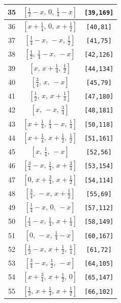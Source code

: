 \documentclass[fleqn,8pt]{jsarticle}
\begin{document}
\begin{longtable}{ccc}
35 & $\left[ \frac{1}{2} - x,\, 0,\, \frac{1}{4} - x \right]$ & {\tt [39,169]} \\ \hline
36 & $\left[ x + \frac{1}{4},\, 0,\, x + \frac{1}{2} \right]$ & {\tt [40,81]} \\ \hline
37 & $\left[ \frac{1}{4} - x,\, - x,\, \frac{1}{2} \right]$ & {\tt [41,75]} \\ \hline
38 & $\left[ \frac{1}{2},\, \frac{1}{4} - x,\, - x \right]$ & {\tt [42,126]} \\ \hline
39 & $\left[ x,\, x + \frac{1}{4},\, \frac{1}{2} \right]$ & {\tt [44,134]} \\ \hline
40 & $\left[ \frac{3}{4},\, x,\, - x \right]$ & {\tt [45,79]} \\ \hline
41 & $\left[ \frac{1}{2},\, x,\, x + \frac{1}{4} \right]$ & {\tt [47,180]} \\ \hline
42 & $\left[ x,\, - x,\, \frac{3}{4} \right]$ & {\tt [48,181]} \\ \hline
43 & $\left[ x + \frac{1}{4},\, \frac{1}{4} - x,\, \frac{1}{4} \right]$ & {\tt [50,118]} \\ \hline
44 & $\left[ x + \frac{1}{4},\, x + \frac{1}{2},\, \frac{1}{2} \right]$ & {\tt [51,161]} \\ \hline
45 & $\left[ x,\, \frac{1}{4},\, - x \right]$ & {\tt [52,56]} \\ \hline
46 & $\left[ \frac{3}{4} - x,\, \frac{1}{4},\, x + \frac{3}{4} \right]$ & {\tt [53,154]} \\ \hline
47 & $\left[ 0,\, x + \frac{3}{4},\, x + \frac{1}{2} \right]$ & {\tt [54,114]} \\ \hline
48 & $\left[ \frac{3}{4},\, - x,\, x + \frac{1}{2} \right]$ & {\tt [55,69]} \\ \hline
49 & $\left[ \frac{1}{4} - x,\, 0,\, - x \right]$ & {\tt [57,112]} \\ \hline
50 & $\left[ \frac{1}{4} - x,\, \frac{1}{4},\, x + \frac{1}{4} \right]$ & {\tt [58,149]} \\ \hline
51 & $\left[ 0,\, - x,\, \frac{1}{4} - x \right]$ & {\tt [60,167]} \\ \hline
52 & $\left[ \frac{1}{2} - x,\, x + \frac{1}{2},\, \frac{1}{4} \right]$ & {\tt [61,72]} \\ \hline
53 & $\left[ \frac{3}{4} - x,\, \frac{1}{2},\, - x \right]$ & {\tt [64,105]} \\ \hline
54 & $\left[ x + \frac{3}{4},\, x + \frac{1}{2},\, 0 \right]$ & {\tt [65,147]} \\ \hline
55 & $\left[ \frac{1}{2},\, x + \frac{1}{4},\, x + \frac{1}{2} \right]$ & {\tt [66,102]} \\ \hline

\end{longtable}
\end{document}
